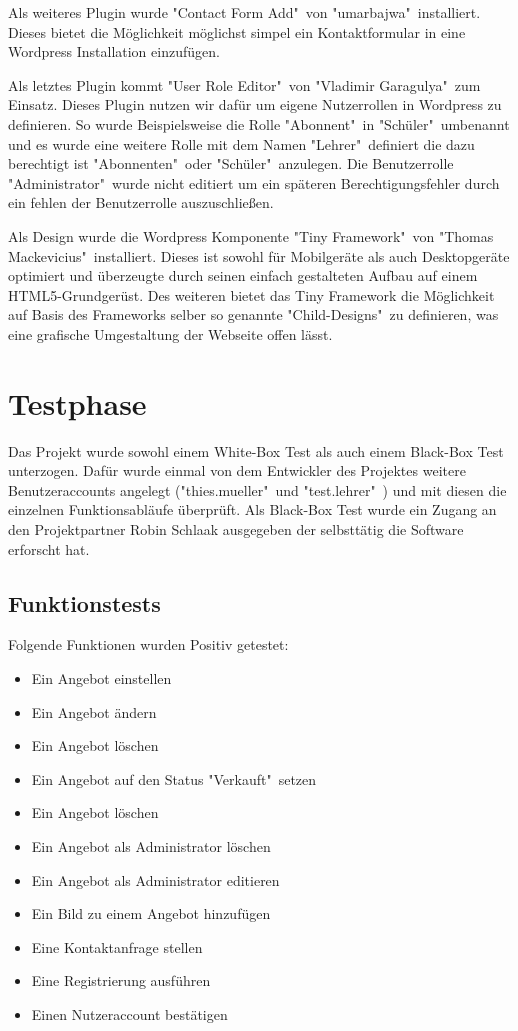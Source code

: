 \documentclass[a4paper, DIV20, 11pt, headsepline, parskip]{article}
\begin{document}
Als weiteres Plugin wurde "Contact Form Add"\ von "umarbajwa"\ installiert.
Dieses bietet die Möglichkeit möglichst simpel ein Kontaktformular in eine Wordpress Installation einzufügen.

Als letztes Plugin kommt "User Role Editor"\ von "Vladimir Garagulya"\ zum Einsatz.
Dieses Plugin nutzen wir dafür um eigene Nutzerrollen in Wordpress zu definieren.
So wurde Beispielsweise die Rolle "Abonnent"\ in "Schüler"\ umbenannt und es wurde eine weitere Rolle mit dem Namen "Lehrer"\ definiert die dazu berechtigt ist "Abonnenten"\ oder "Schüler"\ anzulegen.
Die Benutzerrolle "Administrator"\ wurde nicht editiert um ein späteren Berechtigungsfehler durch ein fehlen der Benutzerrolle auszuschließen.

Als Design wurde die Wordpress Komponente "Tiny Framework"\ von "Thomas Mackevicius"\ installiert.
Dieses ist sowohl für Mobilgeräte als auch Desktopgeräte optimiert und überzeugte durch seinen einfach gestalteten Aufbau auf einem HTML5-Grundgerüst.
Des weiteren bietet das Tiny Framework die Möglichkeit auf Basis des Frameworks selber so genannte "Child-Designs"\ zu definieren, was eine grafische Umgestaltung der Webseite offen lässt.
\section{Testphase}
Das Projekt wurde sowohl einem White-Box Test als auch einem Black-Box Test unterzogen.
Dafür wurde einmal von dem Entwickler des Projektes weitere Benutzeraccounts angelegt ("thies.mueller"\ und "test.lehrer"\ ) und mit diesen die einzelnen Funktionsabläufe überprüft.
Als Black-Box Test wurde ein Zugang an den Projektpartner Robin Schlaak ausgegeben der selbsttätig die Software erforscht hat.
\subsection{Funktionstests}
Folgende Funktionen wurden Positiv getestet:
\begin{itemize}
\item Ein Angebot einstellen
\item Ein Angebot ändern
\item Ein Angebot löschen
\item Ein Angebot auf den Status "Verkauft"\ setzen
\item Ein Angebot löschen
\item Ein Angebot als Administrator löschen
\item Ein Angebot als Administrator editieren
\item Ein Bild zu einem Angebot hinzufügen
\item Eine Kontaktanfrage stellen
\item Eine Registrierung ausführen
\item Einen Nutzeraccount bestätigen
\end{itemize}
\end{document}

